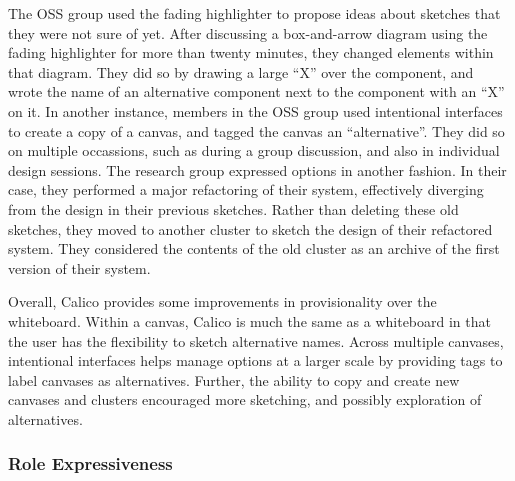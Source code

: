 The OSS group used the fading highlighter to propose ideas about sketches that they were not sure of yet. After discussing a box-and-arrow diagram using the fading highlighter for more than twenty minutes, they changed elements within that diagram. They did so by drawing a large ``X'' over the component, and wrote the name of an alternative component next to the component with an ``X'' on it. In another instance, members in the OSS group used intentional interfaces to create a copy of a canvas, and tagged the canvas an ``alternative''. They did so on multiple occassions, such as during a group discussion, and also in individual design sessions. The research group expressed options in another fashion. In their case, they performed a major refactoring of their system, effectively diverging from the design in their previous sketches. Rather than deleting these old sketches, they moved to another cluster to sketch the design of their refactored system. They considered the contents of the old cluster as an archive of the first version of their system. 

%
 
Overall, Calico provides some improvements in provisionality over the whiteboard. Within a canvas, Calico is much the same as a whiteboard in that the user has the flexibility to sketch alternative names. Across multiple canvases, intentional interfaces helps manage options at a larger scale by providing tags to label canvases as alternatives. Further, the ability to copy and create new canvases and clusters encouraged more sketching, and possibly exploration of alternatives.


\subsubsection{Role Expressiveness}

